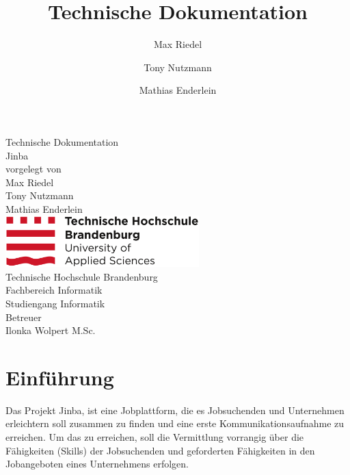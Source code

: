 \documentclass[12pt, letterpaper]{article}
\title{Technische Dokumentation}
\author{Max Riedel \and Tony Nutzmann \and Mathias Enderlein}
\begin{document}
    \begin{titlepage}
        \clearpage
        \begin{center}
        {\Large Technische Dokumentation}\\[3mm]
        {\Huge Jinba}\\[20mm]

        {vorgelegt von}\\[2mm]
        {\large Max Riedel}\\[2mm]
        {\large Tony Nutzmann}\\[2mm]
        {\large Mathias Enderlein}\\[50mm]

        \includegraphics[width=75mm]{img/Technische_Hochschule_Brandenburg_Logo.svg.png}\\[10mm]

        {Technische Hochschule Brandenburg}\\[2mm]

        {Fachbereich Informatik}\\[2mm]

        {Studiengang Informatik}\\[20mm]

        {Betreuer \\[2mm] Ilonka Wolpert M.Sc.}
        \end{center}

        \thispagestyle{empty}
    \end{titlepage}

    \begin{versionhistory}
    \end{versionhistory}
    \newpage
    \tableofcontents
    \newpage
    \section{Einführung}

    Das Projekt Jinba, ist eine Jobplattform, die es Jobsuchenden und Unternehmen
    erleichtern soll zusammen zu finden und eine erste Kommunikationsaufnahme zu erreichen.
    Um das zu erreichen, soll die Vermittlung vorrangig über die Fähigkeiten (Skills) der Jobsuchenden
    und geforderten Fähigkeiten in den Jobangeboten eines Unternehmens erfolgen.
\end{document}
